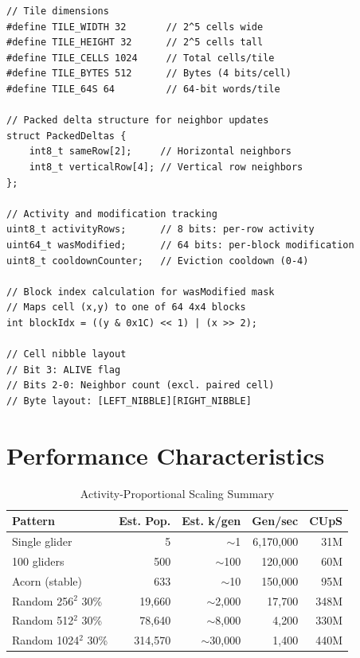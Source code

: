 \documentclass[11pt]{article}
\theoremstyle{definition}
\begin{document}
    \begin{lstlisting}
// Tile dimensions
#define TILE_WIDTH 32       // 2^5 cells wide
#define TILE_HEIGHT 32      // 2^5 cells tall
#define TILE_CELLS 1024     // Total cells/tile
#define TILE_BYTES 512      // Bytes (4 bits/cell)
#define TILE_64S 64         // 64-bit words/tile

// Packed delta structure for neighbor updates
struct PackedDeltas {
    int8_t sameRow[2];     // Horizontal neighbors
    int8_t verticalRow[4]; // Vertical row neighbors
};

// Activity and modification tracking
uint8_t activityRows;      // 8 bits: per-row activity
uint64_t wasModified;      // 64 bits: per-block modification
uint8_t cooldownCounter;   // Eviction cooldown (0-4)

// Block index calculation for wasModified mask
// Maps cell (x,y) to one of 64 4x4 blocks
int blockIdx = ((y & 0x1C) << 1) | (x >> 2);

// Cell nibble layout
// Bit 3: ALIVE flag
// Bits 2-0: Neighbor count (excl. paired cell)
// Byte layout: [LEFT_NIBBLE][RIGHT_NIBBLE]
    \end{lstlisting}

    \section{Performance Characteristics}

    \begin{table}[h]
        \centering
        \caption{Activity-Proportional Scaling Summary}
        \begin{tabular}{@{}lrrrr@{}}
            \toprule
            \textbf{Pattern} & \textbf{Est. Pop.} & \textbf{Est. k/gen} & \textbf{Gen/sec} & \textbf{CUpS} \\
            \midrule
            Single glider & 5 & $\sim$1 & 6,170,000 & 31M \\
            100 gliders & 500 & $\sim$100 & 120,000 & 60M \\
            Acorn (stable) & 633 & $\sim$10 & 150,000 & 95M \\
            Random 256$^2$ 30\% & 19,660 & $\sim$2,000 & 17,700 & 348M \\
            Random 512$^2$ 30\% & 78,640 & $\sim$8,000 & 4,200 & 330M \\
            Random 1024$^2$ 30\% & 314,570 & $\sim$30,000 & 1,400 & 440M \\
            \bottomrule
        \end{tabular}
    \end{table}
\end{document}
